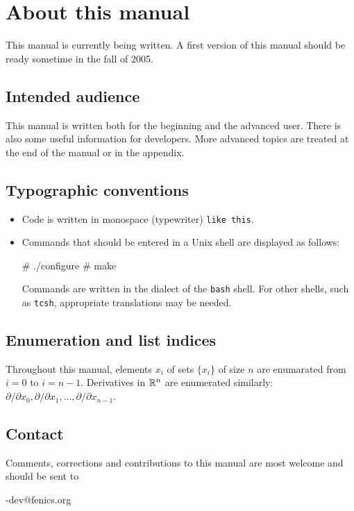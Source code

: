 
\chapter*{About this manual}

This manual is currently being written. A first version of this manual
should be ready sometime in the fall of 2005.

\section*{Intended audience}

This manual is written both for the beginning and the advanced user.
There is also some useful information for developers. More advanced topics
are treated at the end of the manual or in the appendix.

\section*{Typographic conventions}

\begin{itemize}
\item
  Code is written in monospace (typewriter) \texttt{like this}.
\item
  Commands that should be entered in a Unix shell
  are displayed as follows:
  \begin{code}
    # ./configure
    # make
  \end{code}
  Commands are written in the dialect of the \texttt{bash} shell. For
  other shells, such as \texttt{tcsh}, appropriate translations may be
  needed.
\end{itemize}

\section*{Enumeration and list indices}

Throughout this manual, elements $x_i$ of sets $\{x_i\}$ of size $n$
are enumarated from $i = 0$ to $i = n-1$. Derivatives in $\mathbb{R}^n$ are
enumerated similarly: $\partial / \partial x_0, \partial / \partial
x_1, \ldots, \partial / \partial x_{n-1}$.

\section*{Contact}

Comments, corrections and contributions to this manual are most welcome
and should be sent to
\begin{code}
  \packagett{}-dev@fenics.org    
\end{code}
